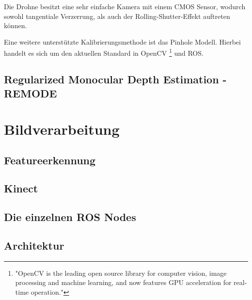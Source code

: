 Die Drohne besitzt eine sehr einfache Kamera mit einem CMOS Sensor, wodurch sowohl tangentiale Verzerrung, als auch der Rolling-Shutter-Effekt auftreten können. \newline

Eine weitere unterstützte Kalibrierungsmethode ist das Pinhole Modell.
Hierbei handelt es sich um den aktuellen Standard in OpenCV \footnote{"OpenCV is the leading open source library for computer vision, image processing and machine learning, and now features GPU acceleration for real-time operation."} %
und ROS.



\subsection{Regularized Monocular Depth Estimation - REMODE}








\section{Bildverarbeitung}
\label{Bildverarbeitung}

\subsection{Featureerkennung}
\subsection{Kinect}
\subsection{Die einzelnen ROS Nodes}
\subsection{Architektur}





